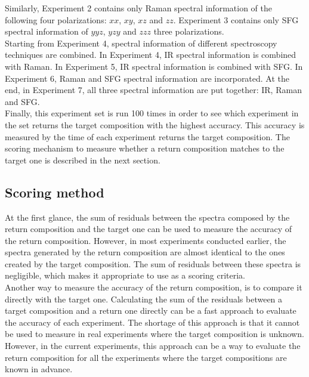 Similarly, Experiment 2 contains only Raman spectral information of the following four polarizations: $xx$, $xy$, $xz$ and $zz$. Experiment 3 contains only SFG spectral information of $yyz$, $yzy$ and $zzz$ three polarizations. \\

Starting from Experiment 4, spectral information of different spectroscopy techniques are combined. In Experiment 4, IR spectral information is combined with Raman. In Experiment 5, IR spectral information is combined with SFG. In Experiment 6, Raman and SFG spectral information are incorporated. At the end, in Experiment 7, all three spectral information are put together: IR, Raman and SFG. \\

Finally, this experiment set is run 100 times in order to see which experiment in the set returns the target composition with the highest accuracy. This accuracy is measured by the time of each experiment returns the target composition. The scoring mechanism to measure whether a return composition matches to the target one is described in the next section. \\

\subsection{Scoring method}

At the first glance, the sum of residuals between the spectra composed by the return composition and the target one can be used to measure the accuracy of the return composition. However, in most experiments conducted earlier, the spectra generated by the return composition are almost identical to the ones created by the target composition. The sum of residuals between these spectra is negligible, which makes it appropriate to use as a scoring criteria. \\

Another way to measure the accuracy of the return composition, is to compare it directly with the target one. Calculating the sum of the residuals between a target composition and a return one directly can be a fast approach to evaluate the accuracy of each experiment. The shortage of this approach is that it cannot be used to measure in real experiments where the target composition is unknown. However, in the current experiments, this approach can be a way to evaluate the return composition for all the experiments where the target compositions are known in advance. \\

